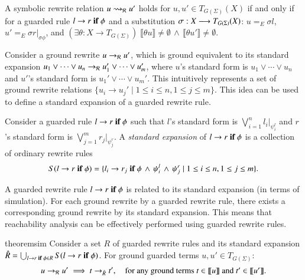 \begin{definition}
\label{def:sym-guarded-rew}
A symbolic rewrite relation $u \rightsquigarrow_{\mathcal{R}} u'$ holds for $u, u' \in
T_{G(\Sigma)}(X)$ if and only if for a guarded rule
$l \rightarrow r\;\textnormal{\bf if}\; {\phi}$ and a substitution
$\sigma : X \longrightarrow T_{G(\Sigma)}(X)$: $u =_E \sigma l$, $u' =_E \sigma
r |_{\sigma \phi}$, and $(\exists \theta : X \to T_{G(\Sigma)})\;
\llbracket \theta u \rrbracket \neq \emptyset \,\wedge\, \llbracket
\theta u' \rrbracket \neq \emptyset$.
\end{definition}


Consider a ground rewrite $u \to_{\mathcal{R}} u'$, which is ground equivalent to
its standard expansion $u_1 \vee \cdots \vee u_n \to_{\mathcal{R}} u_1' \vee
\cdots \vee u_m'$, where $u$'s standard form is $u_1 \vee \cdots \vee
u_n$ and $u'$'s standard form is $u_1' \vee \cdots \vee u_m'$.  This
intuitively represents a set of ground rewrite relations $\{u_i \to
u_j' \mid 1 \leq i \leq n, 1 \leq j \leq m\}$.
%
This idea can be used to define a standard expansion of a guarded
rewrite rule.

\begin{definition}
Consider 
a guarded rule $l \rightarrow r\;\textnormal{\bf if}\; {\phi}$
such that $l$'s standard form is $\bigvee_{i=1}^n l_i |_{\psi_i^l}$ and 
$r$'s standard form is $\bigvee_{j=1}^m r_j |_{\psi_j^r}$.
%
A \emph{standard expansion} of $l \rightarrow r\;\textnormal{\bf if}\; {\phi}$
is
a collection of ordinary rewrite rules
\[
S(l \rightarrow r\;\textnormal{\bf if}\; {\phi}) = \{ l_i \rightarrow r_j\;\textnormal{\bf if}\; {\phi \,\wedge\, \psi_i^l \,\wedge\, \psi_j^r} \mid 1 \leq i \leq n, 1 \leq j \leq m\}.
\]
\end{definition}


A guarded rewrite rule $l \rightarrow r\;\textnormal{\bf if}\; {\phi}$ 
is related to  its standard expansion (in terms of simulation).
%
For each ground rewrite by a guarded rewrite rule, there exists a
corresponding ground rewrite by its standard expansion.  This means
that reachability analysis can be effectively performed using guarded
rewrite rules.

\begin{restatable}{theorem}{sim}
\label{thm:sim}
Consider a set $R$ of guarded rewrite rules
and its standard expansion $\hat{R} = \bigcup_{l \rightarrow r\;\textnormal{\bf if}\; {\phi} \in R} S(l \rightarrow r\;\textnormal{\bf if}\; {\phi})$.
For ground guarded terms $u, u' \in T_{G(\Sigma)}$:
%
\[
u \to_{\mathcal{R}} u'
\implies
t \to_{\hat{R}} t',
\quad
\mbox{for any ground terms $t \in \llbracket  u \rrbracket$ and $t' \in \llbracket u' \rrbracket$.}
\]
\end{restatable}




